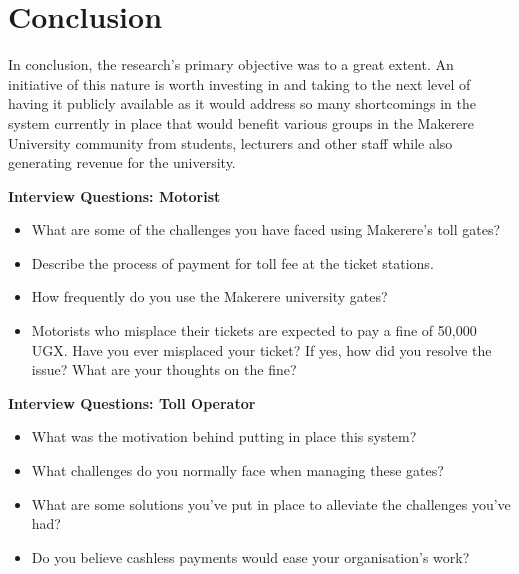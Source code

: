 \section{Conclusion}
  In conclusion, the research's primary objective was to a great extent. An initiative of this nature is worth investing in and taking to the next level of having it publicly available as it would address so many shortcomings in the system currently in place that would benefit various groups in the Makerere University community from students, lecturers and other staff while also generating revenue for the university.


\clearpage


\begin{appendices}
    \textbf{Interview Questions: Motorist}
    \begin{itemize}
        \item What are some of the challenges you have faced using Makerere's toll gates?
        \item Describe the process of payment for toll fee at the ticket stations.
        \item How frequently do you use the Makerere university gates?
        \item Motorists who misplace their tickets are expected to pay a fine of 50,000 UGX. Have you ever misplaced your ticket? If yes, how did you resolve the issue? What are your thoughts on the fine?
    \end{itemize}

    \textbf{Interview Questions: Toll Operator}
    \begin{itemize}
        \item What was the motivation behind putting in place this system?
        \item What challenges do you normally face when managing these gates?
        \item What are some solutions you've put in place to alleviate the challenges you've had?
        \item Do you believe cashless payments would ease your organisation's work?
    \end{itemize}



\end{appendices}
